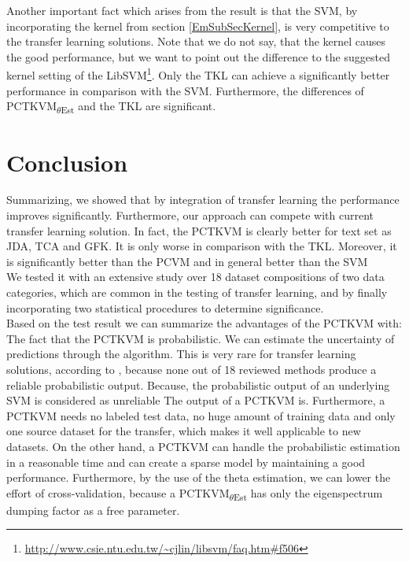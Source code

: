 Another important fact which arises from the result is that the \acs{SVM}, by incorporating the kernel from section \ref{EmSubSecKernel}, is very competitive to the transfer learning solutions.
Note that we do not say, that the kernel causes the good performance, but we want to point out the difference to the suggested  kernel setting of the LibSVM\footnote{\url{http://www.csie.ntu.edu.tw/~cjlin/libsvm/faq.htm\#f506}}.
Only the \acs{TKL} can achieve a significantly better performance in comparison with the \acs{SVM}.
Furthermore, the differences of \acs{PCTKVM}\textsubscript{$\theta$Est} and the \acs{TKL} are significant. 
\FloatBarrier
\section{Conclusion}\label{EmSecConc}
Summarizing, we showed that by integration of transfer learning the performance improves significantly. Furthermore, our approach can compete with current transfer learning solution.
In fact, the \acs{PCTKVM} is clearly better for text set as \acs{JDA}, \acs{TCA} and \acs{GFK}.
It is only worse in comparison with the \acs{TKL}.
Moreover, it is significantly better than the \acs{PCVM} and in general better than the \acs{SVM} \\
We tested it with an extensive study over 18 dataset compositions of two data categories, which are common in the testing of transfer learning, and by finally incorporating two statistical procedures to determine significance.\\
Based on the test result we can summarize the advantages of the \acs{PCTKVM} with:
The fact that the \acs{PCTKVM} is probabilistic. We can estimate the uncertainty of predictions through the algorithm.
This is very rare for transfer learning solutions, according to \cite{Weiss.2016}, because none out of 18 reviewed methods produce a reliable probabilistic output.
Because, the probabilistic output of an underlying \acs{SVM} is considered as unreliable\cite{Tipping.2001} The output of a \acs{PCTKVM} is.\cite{Chen.2009}
Furthermore, a \acs{PCTKVM} needs no labeled test data, no huge amount of training data and only one source dataset for the transfer, which makes it well applicable to new datasets.
On the other hand, a \acs{PCTKVM} can handle the probabilistic estimation in a reasonable time and can create a sparse model by maintaining a good performance.
Furthermore, by the use of the theta estimation, we can lower the effort of cross-validation, because a \acs{PCTKVM}\textsubscript{$\theta$Est} has only the eigenspectrum dumping factor as a free parameter.

